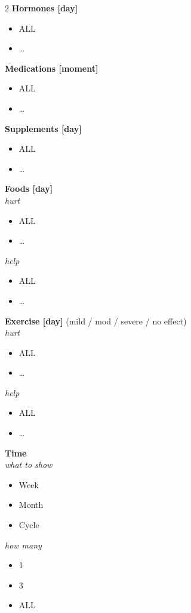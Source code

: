 \begin{multicols}{2}
  \textbf{Hormones [day]}
  \begin{itemize}
    \item ALL
    \item \ldots
  \end{itemize}

  \textbf{Medications [moment]}
  \begin{itemize}
    \item ALL
    \item \ldots
  \end{itemize}

  \textbf{Supplements [day]}
  \begin{itemize}
    \item ALL
    \item \ldots
  \end{itemize}

  \textbf{Foods [day]}\\
  \textit{hurt}
  \begin{itemize}
    \item ALL
    \item \ldots
  \end{itemize}
  \textit{help}
  \begin{itemize}
    \item ALL
    \item \ldots
  \end{itemize}

  \textbf{Exercise [day]} (mild / mod / severe / no effect)\\
  \textit{hurt}
  \begin{itemize}
    \item ALL
    \item \ldots
  \end{itemize}
  \textit{help}
  \begin{itemize}
    \item ALL
    \item \ldots
  \end{itemize}

  \textbf{Time}\\
  \textit{what to show}
  \begin{itemize}
    \item Week
    \item Month
    \item Cycle
  \end{itemize}
  \textit{how many}
  \begin{itemize}
    \item 1
    \item 3
    \item ALL
  \end{itemize}


\end{multicols}
